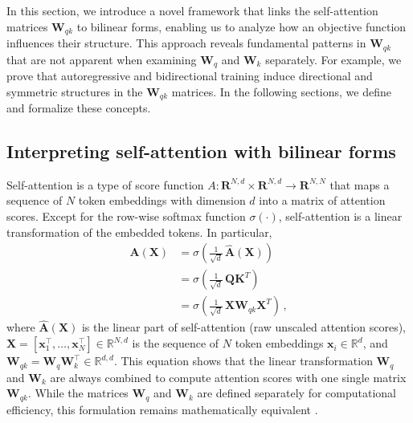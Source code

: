 %
In this section, we introduce a novel framework that links the self-attention matrices $\bm{W}_{qk}$ to bilinear forms, enabling us to analyze how an objective function influences their structure.
%
This approach reveals fundamental patterns in $\bm{W}_{qk}$  that are not apparent when examining $\bm{W}_q$ and $\bm{W}_k$ separately.  
%
For example, we prove that autoregressive and bidirectional training induce directional and symmetric structures in the $\bm{W}_{qk}$ matrices.
%
In the following sections, we define and formalize these concepts.
%










\subsection{Interpreting self-attention with bilinear forms}
%
%
Self-attention \citep{vaswaniAttentionAllYou2017,radfordLanguageModelsAre2019} is 
a type of score function $A: \mathbf{R}^{N,d} \times \mathbf{R}^{N,d} \rightarrow \mathbf{R}^{N,N}$ that maps a sequence of $N$ token embeddings with dimension $d$ into a matrix of attention scores.
%
Except for the row-wise softmax function $\sigma(\cdot)$, self-attention is a linear transformation of the embedded tokens.
%
In particular, 
%
\begin{equation}
\label{eq:results:self-attention-bilinear-form}
\begin{split}
    \bm{A}(\bm{X}) 
    & = \sigma\left(\frac{1}{\sqrt{d}}\,\hat{\bm{A}}(\bm{X})\right) \\
    & = \sigma\left(\frac{1}{\sqrt{d}}\,\bm{Q} \bm{K}^T\right) \\
    & = \sigma\left(\frac{1}{\sqrt{d}}\,\bm{X} \bm{W}_{qk}\bm{X}^T\right) \,,
\end{split}
\end{equation}
where $\hat{\bm{A}}(\bm{X})$ is the linear part of self-attention (raw unscaled attention scores), $\bm{X} = [\bm{x}^\top_1, \dots, \bm{x}^\top_N] \in \mathbb{R}^{N,d} $ is the sequence of $N$ token embeddings $\bm{x}_i \in \mathbb{R}^d$,  and $\bm{W}_{qk} = \bm{W}_q\bm{W}_k^\top \in \mathbb{R}^{d,d}$.
%
This equation shows that the linear transformation $\bm{W}_q$ and $\bm{W}_k$ are always combined to compute attention scores with one single matrix $\bm{W}_{qk}$.
%
While the matrices $\bm{W}_q$ and $\bm{W}_k$ are defined separately for computational efficiency, this formulation remains mathematically equivalent \citep[see also][]{elhageMathematicalFrameworkTransformer2021, olssonIncontextLearningInduction2022,darAnalyzingTransformersEmbedding2023}.
%

